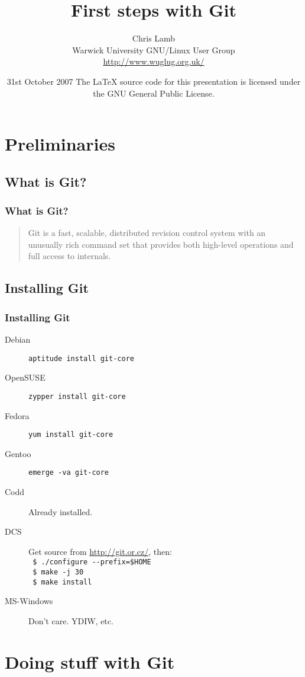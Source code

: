 \documentclass{beamer}
\title{First steps with Git}
\author[Chris Lamb, WUGLUG]{Chris Lamb\\Warwick University GNU/Linux User Group\\\small{\url{http://www.wuglug.org.uk/}}} %
\date{31st October 2007
\newline
\newline
\tiny{The \LaTeX{} source code for this presentation is licensed under the GNU General Public License.}}
\begin{document}
\frame{\titlepage}

\section{Preliminaries}

\subsection{What is Git?}
\frame
{
    \frametitle{What is Git?}

    \begin{quote}
        Git is a fast, scalable, distributed revision control system with an
        unusually rich command set that provides both high-level operations and
        full access to internals.
    \end{quote}
}

\subsection{Installing Git}
\begin{frame}[fragile]
    \frametitle{Installing Git}

    \begin{description}
        \item[Debian] \verb/aptitude install git-core/
        \item[OpenSUSE] \verb/zypper install git-core/
        \item[Fedora] \verb/yum install git-core/
        \item[Gentoo] \verb/emerge -va git-core/
        \item[Codd] Already installed.
        \item[DCS] Get source from \url{http://git.or.cz/}, then: \\ 
            \verb# $ ./configure --prefix=$HOME# \\
            \verb# $ make -j 30# \\
            \verb# $ make install#
        \item[MS-Windows] Don't care. YDIW, etc.
    \end{description}
\end{frame}


\section{Doing stuff with Git}
\end{document}
